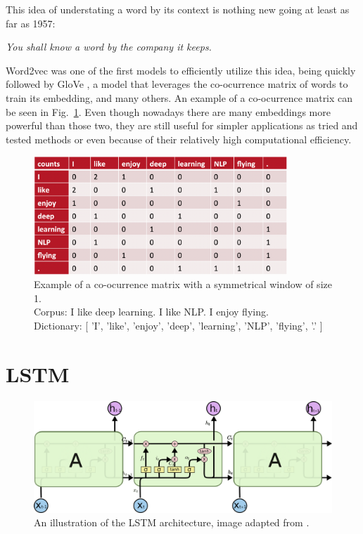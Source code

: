 This idea of understating a word by its context is nothing new going at least as far as 1957:

\begin{myquote}
\textit{You shall know a word by the company it keeps.}\\
\citet{firth1957synopsis}
\end{myquote}

Word2vec was one of the first models to efficiently utilize this idea, being quickly followed by GloVe \citep{glove}, a model that leverages the co-ocurrence matrix of words to train its embedding, and many others. An example of a co-ocurrence matrix can be seen in Fig.~\ref{coocurence}. Even though nowadays there are many embeddings more powerful than those two, they are still useful for simpler applications as tried and tested methods or even because of their relatively high computational efficiency.


\begin{figure}[!ht]
\centerline{\includegraphics[width=0.85\textwidth]{figuras/coocurence.png}}
\caption{Example of a co-ocurrence matrix with a symmetrical window of size 1.\\
Corpus: I like deep learning. I like NLP. I enjoy flying.\\
Dictionary: [ 'I', 'like', 'enjoy', 'deep', 'learning', 'NLP', 'flying', '.' ] \citep{coocurrence}
}
\label{coocurence}
\end{figure}

\section{LSTM}

\begin{figure}[!ht]
\centerline{\includegraphics[width=1.1\textwidth]{figuras/lstm.png}}
\caption{An illustration of the LSTM architecture, image adapted from \citet{lstm_imagem}.
}
\label{fig:lstm}
\end{figure}

